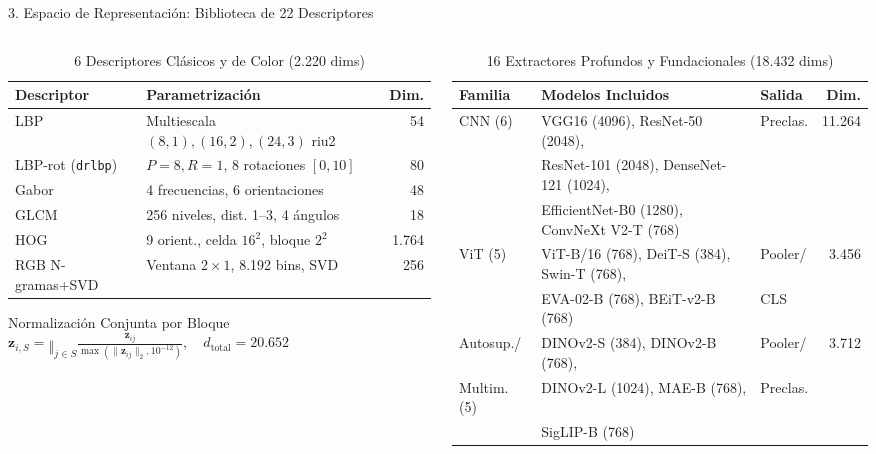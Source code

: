 \documentclass[aspectratio=169,10pt]{beamer}
\begin{document}
\begin{frame}{3. Espacio de Representación: Biblioteca de 22 Descriptores}
\begin{columns}[T]
\begin{column}{0.44\textwidth}
\begin{table}
\centering
\scriptsize
\caption{6 Descriptores Clásicos y de Color (2.220 dims)}
\begin{tabular}{@{}llr@{}}
\toprule
Descriptor & Parametrización & Dim. \\
\midrule
LBP & Multiescala $(8,1),(16,2),(24,3)$ riu2 & 54 \\
LBP-rot (\texttt{drlbp}) & $P=8, R=1$, 8 rotaciones $[0,10]$ & 80 \\
Gabor & 4 frecuencias, 6 orientaciones & 48 \\
GLCM & 256 niveles, dist. 1--3, 4 ángulos & 18 \\
HOG & 9 orient., celda $16^2$, bloque $2^2$ & 1.764 \\
RGB N-gramas+SVD & Ventana $2\times 1$, 8.192 bins, SVD & 256 \\
\bottomrule
\end{tabular}
\end{table}
\vspace{-0.3em}
\begin{block}{\scriptsize Normalización Conjunta por Bloque}
\centering
$\displaystyle \mathbf{z}_{i,S}=\mathop{\Vert}_{j\in S}\frac{\mathbf{z}_{ij}}{\max(\lVert\mathbf{z}_{ij}\rVert_2,10^{-12})}, \quad d_{\text{total}} = 20.652$
\end{block}
\end{column}
\begin{column}{0.53\textwidth}
\begin{table}
\centering
\scriptsize
\caption{16 Extractores Profundos y Fundacionales (18.432 dims)}
\begin{tabular}{@{}lllr@{}}
\toprule
Familia & Modelos Incluidos & Salida & Dim. \\
\midrule
CNN (6) & VGG16 (4096), ResNet-50 (2048), & Preclas. & 11.264 \\
        & ResNet-101 (2048), DenseNet-121 (1024), & & \\
        & EfficientNet-B0 (1280), ConvNeXt V2-T (768) & & \\
\midrule
ViT (5) & ViT-B/16 (768), DeiT-S (384), Swin-T (768), & Pooler/ & 3.456 \\
        & EVA-02-B (768), BEiT-v2-B (768) & CLS & \\
\midrule
Autosup./ & DINOv2-S (384), DINOv2-B (768), & Pooler/ & 3.712 \\
Multim. (5) & DINOv2-L (1024), MAE-B (768), & Preclas. & \\
        & SigLIP-B (768) & & \\
\bottomrule
\end{tabular}
\end{table}
\end{column}
\end{columns}
\end{frame}
\end{document}
